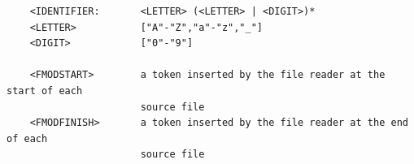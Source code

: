 \begin{verbatim}
    <IDENTIFIER:       <LETTER> (<LETTER> | <DIGIT>)*
    <LETTER>           ["A"-"Z","a"-"z","_"]
    <DIGIT>            ["0"-"9"]

    <FMODSTART>        a token inserted by the file reader at the start of each
                       source file
    <FMODFINISH>       a token inserted by the file reader at the end of each
                       source file
    \end{verbatim}
